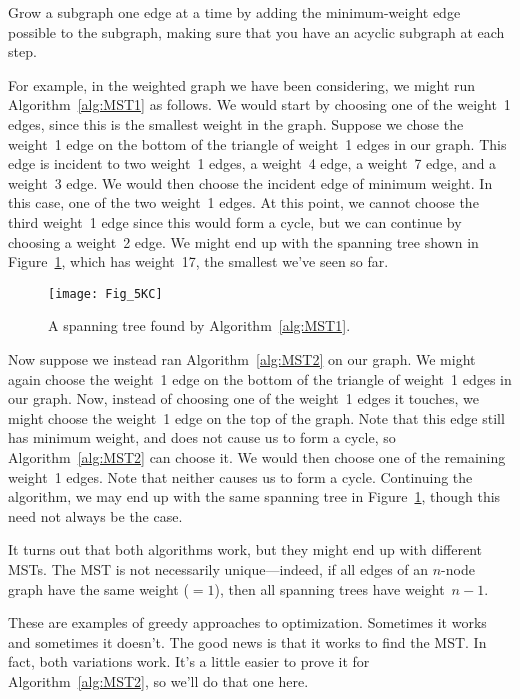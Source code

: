 \begin{algorithm}\label{alg:MST2}
Grow a subgraph one edge at a time by adding the minimum-weight edge
possible to the subgraph, making sure that you have an acyclic
subgraph at each step.
\end{algorithm}

For example, in the weighted graph we have been considering, we might
run Algorithm~\ref{alg:MST1} as follows.  We would start by choosing
one of the weight~1 edges, since this is the smallest weight in the
graph.  Suppose we chose the weight~1 edge on the bottom of the
triangle of weight~1 edges in our graph.  This edge is incident to two
weight~1 edges, a weight~4 edge, a weight~7 edge, and a weight~3
edge.  We would then choose the incident edge of minimum weight.  In
this case, one of the two weight~1 edges.  At this point, we cannot
choose the third weight~1 edge since this would form a cycle, but we
can continue by choosing a weight~2 edge.  We might end up with the
spanning tree shown in Figure~\ref{fig:5KC}, which has weight~17, the
smallest we've seen so far.

\begin{figure}\redrawn

\texttt{[image: Fig\_5KC]}

\caption{A spanning tree found by Algorithm~\ref{alg:MST1}.}

\label{fig:5KC}

\end{figure}

Now suppose we instead ran Algorithm~\ref{alg:MST2} on our graph.  We
might again choose the weight~1 edge on the bottom of the triangle of
weight~1 edges in our graph.  Now, instead of choosing one of the
weight~1 edges it touches, we might choose the weight~1 edge on the
top of the graph.  Note that this edge still has minimum weight, and
does not cause us to form a cycle, so Algorithm~\ref{alg:MST2} can
choose it.  We would then choose one of the remaining weight~1 edges.
Note that neither causes us to form a cycle.  Continuing the
algorithm, we may end up with the same spanning tree in
Figure~\ref{fig:5KC}, though this need not always be the case.

It turns out that both algorithms work, but they might end up with
different MSTs.  The MST is not necessarily unique---indeed, if all
edges of an $n$-node graph have the same weight (${}=1$), then all
spanning trees have weight~$n - 1$.

These are examples of greedy approaches to optimization.  Sometimes it
works and sometimes it doesn't.  The good news is that it works to
find the MST\@.  In fact, both variations work.  It's a little easier
to prove it for Algorithm~\ref{alg:MST2}, so we'll do that one here.

